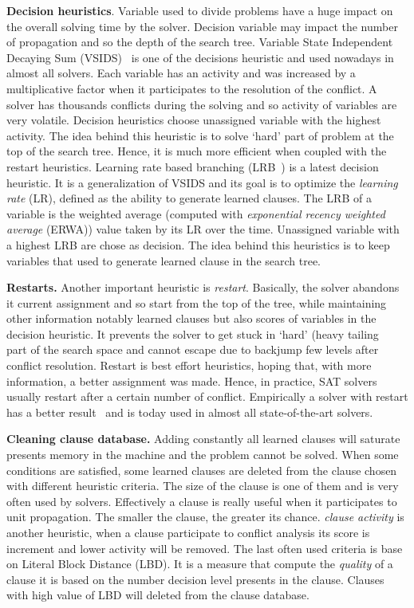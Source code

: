\textbf{Decision heuristics}. Variable used to divide problems have a huge impact on the 
overall solving time by the solver. Decision variable may impact the number of propagation and so 
the depth of the search tree.
Variable State Independent Decaying Sum (VSIDS)~\cite{moskewicz2001chaff} is one of the decisions heuristic and used
nowadays in almost all solvers. Each variable has an activity and was increased by a multiplicative factor 
when it participates to the resolution of the conflict.
A solver has thousands conflicts during the solving and so activity of variables are very volatile.
Decision heuristics choose unassigned variable with the highest activity.
The idea behind this heuristic is to solve ‘hard’ part of problem at the top of the search tree.
Hence, it is much more efficient when coupled with the restart heuristics. 
Learning rate based branching (LRB~\cite{liang2016learning}) is a latest decision heuristic. It is a
generalization of VSIDS and its goal is to optimize the \emph{learning rate} (LR), defined as the ability to generate
learned clauses. The LRB of a variable is the weighted average (computed with \emph{exponential recency
weighted average} (ERWA))  value taken by its LR over the time. Unassigned variable with a highest LRB are chose as decision. 
The idea behind this heuristics is to keep variables that used to generate learned clause in the search tree.

\textbf{Restarts.}
Another important heuristic is \emph{restart}. Basically, the solver abandons it current assignment and so 
start from the top of the tree, while maintaining other information notably learned clauses but also scores of variables in the decision heuristic. 
It prevents the solver to get stuck in ‘hard’ (heavy tailing~\cite{gomes1997heavy} part of the search space and cannot escape due 
to backjump few levels after conflict resolution. Restart is best effort heuristics, hoping that,
with more information, a better assignment was made. Hence, in practice, SAT solvers usually restart after a
certain number of conflict. Empirically a solver with restart has a better result~\cite{huang2007effect} and is today
used in almost all state-of-the-art solvers.


\textbf{Cleaning clause database.}
Adding constantly all learned clauses will saturate presents memory in the machine and the 
problem cannot be solved. When some conditions are satisfied, some learned clauses are
deleted from the clause chosen with different heuristic criteria. The size of the clause
is one of them and is very often used by solvers. Effectively a clause is really useful when 
it participates to unit propagation. The smaller the clause, the greater its chance.
\emph{clause activity} is another heuristic, when a clause participate to conflict analysis 
its score is increment and lower activity will be removed. The last often used criteria 
is base on Literal Block Distance (LBD). It is a measure that compute the \emph{quality} of a clause
it is based on the number decision level presents in the clause. Clauses with high value of LBD will 
deleted from the clause database.


